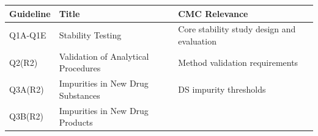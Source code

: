 \documentclass[
  11pt,
  a4paper,
]{report}
\begin{document}
\begin{longtable}[]{@{}lll@{}}
\toprule
\begin{minipage}[b]{0.30\columnwidth}\raggedright
Guideline\strut
\end{minipage} & \begin{minipage}[b]{0.19\columnwidth}\raggedright
Title\strut
\end{minipage} & \begin{minipage}[b]{0.41\columnwidth}\raggedright
CMC Relevance\strut
\end{minipage}\tabularnewline
\midrule
\endhead
\begin{minipage}[t]{0.30\columnwidth}\raggedright
Q1A-Q1E\strut
\end{minipage} & \begin{minipage}[t]{0.19\columnwidth}\raggedright
Stability Testing\strut
\end{minipage} & \begin{minipage}[t]{0.41\columnwidth}\raggedright
Core stability study design and evaluation\strut
\end{minipage}\tabularnewline
\begin{minipage}[t]{0.30\columnwidth}\raggedright
Q2(R2)\strut
\end{minipage} & \begin{minipage}[t]{0.19\columnwidth}\raggedright
Validation of Analytical Procedures\strut
\end{minipage} & \begin{minipage}[t]{0.41\columnwidth}\raggedright
Method validation requirements\strut
\end{minipage}\tabularnewline
\begin{minipage}[t]{0.30\columnwidth}\raggedright
Q3A(R2)\strut
\end{minipage} & \begin{minipage}[t]{0.19\columnwidth}\raggedright
Impurities in New Drug Substances\strut
\end{minipage} & \begin{minipage}[t]{0.41\columnwidth}\raggedright
DS impurity thresholds\strut
\end{minipage}\tabularnewline
\begin{minipage}[t]{0.30\columnwidth}\raggedright
Q3B(R2)\strut
\end{minipage} & \begin{minipage}[t]{0.19\columnwidth}\raggedright
Impurities in New Drug Products\strut
\end{minipage} & \begin{minipage}[t]{0.41\columnwidth}\raggedright

\end{minipage}
\end{longtable}
\end{document}
